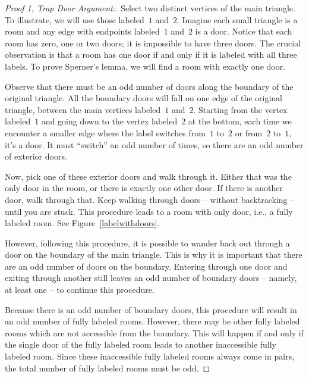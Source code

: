 \documentclass[a4paper,10pt,reqno, english]{amsart}
\theoremstyle{plain}
\theoremstyle{definition}
\begin{document}
\begin{proof}[Proof 1, Trap Door Argument:]
	Select two distinct vertices of the main triangle. To illustrate, we will use those labeled~$1$ and~$2$. Imagine each small triangle is a room and 
	any edge with endpoints labeled~$1$ and~$2$ is a door. Notice that each room has zero, one or two doors; it is impossible to have three doors. 
	The crucial observation is that a room has one door if and only if it is labeled with all three labels. To prove Sperner's lemma, we will find a room 
	with exactly one door. 
	
	Observe that there must be an odd number of doors along the boundary of the original triangle. All the boundary doors will fall on one edge of the original 
	triangle, between the main vertices labeled~$1$ and~$2$. Starting from the vertex labeled~$1$ and going down to the vertex labeled~$2$ at the bottom, 
	each time we encounter a smaller edge where the label switches from~$1$ to~$2$ or from~$2$ to~$1$, it's a door. It must ``switch'' an odd number of 
	times, so there are an odd number of exterior doors.
	
	Now, pick one of these exterior doors and walk through it. Either that was the only door in the room, or there is exactly one other door. If there is another 
	door, walk through that. Keep walking through doors -- without backtracking -- until you are stuck. This procedure leads to a room with only door, i.e., a 
	fully labeled room. See Figure~\ref{labelwithdoors}.
	
	However, following this procedure, it is possible to wander back out through a door on the boundary of the main triangle. This is why it is important that 
	there are an odd number of doors on the boundary. Entering through one door and exiting through another still leaves an odd number of boundary 
	doors -- namely, at least one -- to continue this procedure.

	
	Because there is an odd number of boundary doors, this procedure will result in an odd number of fully labeled rooms. However, there may be other 
	fully labeled rooms which are not accessible from the boundary. This will happen if and only if the single door of the fully labeled room leads to another 
	inaccessible fully labeled room. Since these inaccessible fully labeled rooms always come in pairs, the total number of fully labeled rooms must be odd.
\end{proof} 
\end{document}
